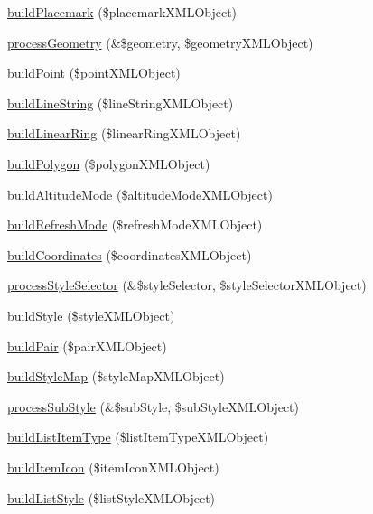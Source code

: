 \begin{DoxyCompactItemize}
\item 
\hyperlink{KMLBuilder_8php_a51cdd7a56da5e2b825fcb9fae6e001dc}{buildPlacemark} (\$placemarkXMLObject)
\item 
\hyperlink{KMLBuilder_8php_a682f0237f7127bf8eb869ce576688eab}{processGeometry} (\&\$geometry, \$geometryXMLObject)
\item 
\hyperlink{KMLBuilder_8php_a78a21d80ec9091ceb1b9e2c0ba08b9ee}{buildPoint} (\$pointXMLObject)
\item 
\hyperlink{KMLBuilder_8php_a16e92f8be5dcb51a79eb5765965ccce8}{buildLineString} (\$lineStringXMLObject)
\item 
\hyperlink{KMLBuilder_8php_a5381e6474bba031a40541b5c9432d143}{buildLinearRing} (\$linearRingXMLObject)
\item 
\hyperlink{KMLBuilder_8php_a4feef2100d82959d83adccd241a9d872}{buildPolygon} (\$polygonXMLObject)
\item 
\hyperlink{KMLBuilder_8php_ad268c19db50c2a4d4cd70911cbbdfae1}{buildAltitudeMode} (\$altitudeModeXMLObject)
\item 
\hyperlink{KMLBuilder_8php_a456cd40ac1c42fe22a9bb7f71e0ba51f}{buildRefreshMode} (\$refreshModeXMLObject)
\item 
\hyperlink{KMLBuilder_8php_a38d0bd9b62f76d050bf7ebf4f126ce44}{buildCoordinates} (\$coordinatesXMLObject)
\item 
\hyperlink{KMLBuilder_8php_a48a9c452a5091a9877a18bfaef9fa971}{processStyleSelector} (\&\$styleSelector, \$styleSelectorXMLObject)
\item 
\hyperlink{KMLBuilder_8php_a739a92e0b06bd419c5d846346188d877}{buildStyle} (\$styleXMLObject)
\item 
\hyperlink{KMLBuilder_8php_addfbf61cd01394bb83000071047cf923}{buildPair} (\$pairXMLObject)
\item 
\hyperlink{KMLBuilder_8php_ab487b7950119c99c59a33dc436cc22aa}{buildStyleMap} (\$styleMapXMLObject)
\item 
\hyperlink{KMLBuilder_8php_aff17f687828c23c21a9f7a46453d2062}{processSubStyle} (\&\$subStyle, \$subStyleXMLObject)
\item 
\hyperlink{KMLBuilder_8php_a5763b58aabfd87a7b410bf1999c121b9}{buildListItemType} (\$listItemTypeXMLObject)
\item 
\hyperlink{KMLBuilder_8php_a60655ad51b5c31c600b5adb50f68a0f7}{buildItemIcon} (\$itemIconXMLObject)
\item 
\hyperlink{KMLBuilder_8php_a582fff4c258f5b1f746c8d3e804eff0f}{buildListStyle} (\$listStyleXMLObject)
\item 

\end{DoxyCompactItemize}
